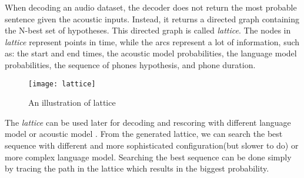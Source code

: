 When decoding an audio dataset, the decoder does not return the most probable sentence given the acoustic inputs. Instead, it returns a directed graph containing the N-best set of hypotheses. This directed graph is called \textit{lattice}. The nodes in \textit{lattice} represent points in time, while the arcs represent a lot of information, such as: the start and end times, the acoustic model probabilities, the language model probabilities, the sequence of phones hypothesis, and phone duration.

\begin{figure}[H]
\caption{An illustration of lattice \cite{Gales:2007:AHM:1373536.1373537}}
\texttt{[image: lattice]} 
\centering
\end{figure}

The \textit{lattice} can be used later for decoding and rescoring with different language model or acoustic model \cite{Murveit1993}. From the generated lattice, we can search the best sequence with different and more sophisticated configuration(but slower to do) or more complex language model. Searching the best sequence can be done simply by tracing the path in the lattice which results in the biggest probability. 

